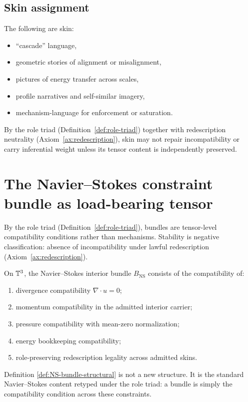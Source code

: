 \subsection{Skin assignment}
The following are skin:
\begin{itemize}[leftmargin=2.2em]
\item ``cascade'' language,
\item geometric stories of alignment or misalignment,
\item pictures of energy transfer across scales,
\item profile narratives and self-similar imagery,
\item mechanism-language for enforcement or saturation.
\end{itemize}
By the role triad (Definition~\ref{def:role-triad}) together with redescription neutrality
(Axiom~\ref{ax:redescription}), skin may not repair incompatibility or carry inferential weight unless its
tensor content is independently preserved.


\section{The Navier--Stokes constraint bundle as load-bearing tensor}
By the role triad (Definition~\ref{def:role-triad}), bundles are tensor-level compatibility conditions
rather than mechanisms. Stability is negative classification: absence of incompatibility under lawful
redescription (Axiom~\ref{ax:redescription}).


\begin{definition}\label{def:NS-bundle-structural}
On $\mathbb{T}^3$, the Navier--Stokes interior bundle $B_{\mathrm{NS}}$ consists of the compatibility of:
\begin{enumerate}[label=(B\arabic*), leftmargin=2.2em]
\item divergence compatibility $\nabla\cdot u=0$;
\item momentum compatibility in the admitted interior carrier;
\item pressure compatibility with mean-zero normalization;
\item energy bookkeeping compatibility;
\item role-preserving redescription legality across admitted skins.
\end{enumerate}
\end{definition}

\begin{remark}
Definition \ref{def:NS-bundle-structural} is not a new structure. It is the standard Navier--Stokes
content retyped under the role triad: a bundle is simply the compatibility condition across these constraints.
\end{remark}

